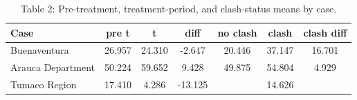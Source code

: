 \begin{table}[ht]
\centering
\caption{Table 2: Pre-treatment, treatment-period, and clash-status means by case.}
\label{tab:prepost_means}
\begin{tabular}{l c c c c c c}
\hline
Case & pre t & t & diff & no clash & clash & clash diff \\
\hline
Buenaventura & 26.957 & 24.310 & -2.647 & 20.446 & 37.147 & 16.701 \\
Arauca Department & 50.224 & 59.652 & 9.428 & 49.875 & 54.804 & 4.929 \\
Tumaco Region & 17.410 & 4.286 & -13.125 &  & 14.626 &  \\
\hline
\end{tabular}
\end{table}
